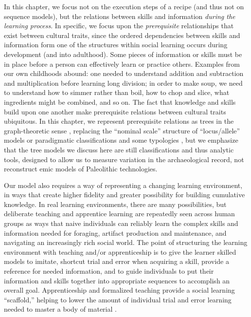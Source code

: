 In this chapter, we focus not on the execution steps of a recipe (and
thus not on sequence models), but the relations between skills and
information \emph{during the learning process}. In specific, we focus
upon the \emph{prerequisite} relationships that exist between cultural
traits, since the ordered dependencies between skills and information
form one of the structures within social learning occurs during
development (and into adulthood). Some pieces of information or skills
must be in place before a person can effectively learn or practice
others. Examples from our own childhoods abound: one needed to
understand addition and subtraction and multiplication before learning
long division; in order to make soup, we need to understand how to
simmer rather than boil, how to chop and slice, what ingredients might
be combined, and so on. The fact that knowledge and skills build upon
one another make prerequisite relations between cultural traits
ubiquitous. In this chapter, we represent prerequisite relations as
trees in the graph-theoretic sense \citep{diestel2010graph}, replacing
the ``nominal scale'' structure of ``locus/allele'' models or
paradigmatic classifications and some typologies \citep{Dunnell1971},
but we emphasize that the tree models we discuss here are still
classifications and thus analytic tools, designed to allow us to measure
variation in the archaeological record, not reconstruct emic models of
Paleolithic technologies.

Our model also requires a way of representing a changing learning
environment, in ways that create higher fidelity and greater possibility
for building cumulative knowledge. In real learning environments, there
are many possibilities, but deliberate teaching and apprentice learning
are repeatedly seen across human groups as ways that naive individuals
can reliably learn the complex skills and information needed for
foraging, artifact production and maintenance, and navigating an
increasingly rich social world. The point of structuring the learning
environment with teaching and/or apprenticeship is to give the learner
skilled models to imitate, shortcut trial and error when acquiring a
skill, provide a reference for needed information, and to guide
individuals to put their information and skills together into
appropriate sequences to accomplish an overall goal. Apprenticeship and
formalized teaching provide a social learning ``scaffold,'' helping to
lower the amount of individual trial and error learning needed to master
a body of material \citep{wimsatt2007reproducing, wimsatt2007re}.

